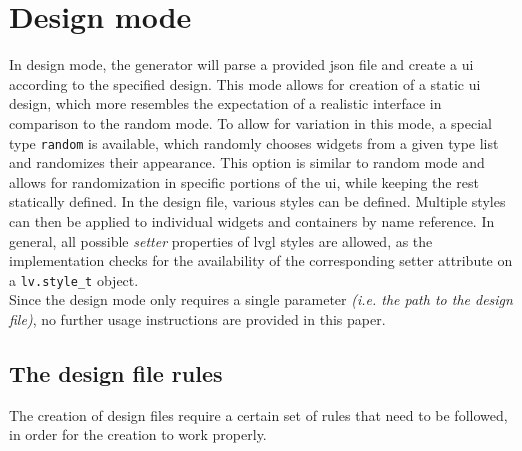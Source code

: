 \documentclass[Bachelor, BIC, english, fhCitStyle, IEEE]{BASE/twbook} %
\newcommand{\nocontentsline}[3]{}
\newcommand{\hidsubsection}[1]{\bgroup\let\addcontentsline=\nocontentsline\subsection{#1}\egroup}
\def\code#1{\texttt{#1}}
\begin{document}
\section{Design mode}
In design mode, the generator will parse a provided \ac{json} file and create a \ac{ui} according to the specified design. This mode allows for creation of a static \ac{ui} design, which more resembles the expectation of a realistic interface in comparison to the random mode. To allow for variation in this mode, a special type \code{random} is available, which randomly chooses widgets from a given type list and randomizes their appearance. This option is similar to random mode and allows for randomization in specific portions of the \ac{ui}, while keeping the rest statically defined. In the design file, various styles can be defined. Multiple styles can then be applied to individual widgets and containers by name reference. In general, all possible \textit{setter} properties of \ac{lvgl} styles are allowed, as the implementation checks for the availability of the corresponding setter attribute on a \code{lv.style\_t} object.\\
Since the design mode only requires a single parameter \textit{(i.e. the path to the design file)}, no further usage instructions are provided in this paper.
\hidsubsection{The design file rules}
The creation of design files require a certain set of rules that need to be followed, in order for the creation to work properly.
\end{document}
